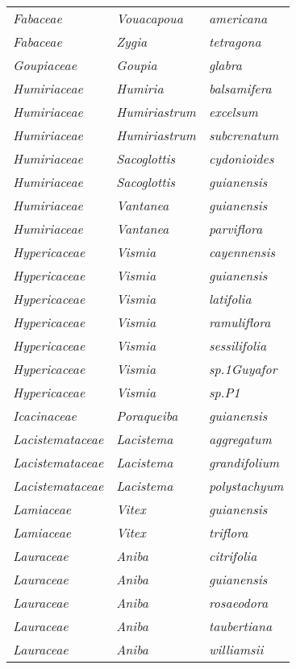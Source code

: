 \documentclass[fleqn,10pt]{ArtEcoFoG} %
\renewenvironment{table}{\begin{table*}}{\end{table*}\ignorespacesafterend}
\begin{document}
\begin{table}
\begin{tabular}[t]{lll}
\em{Fabaceae} & \em{Vouacapoua} & \em{americana}\\
\em{Fabaceae} & \em{Zygia} & \em{tetragona}\\
\em{Goupiaceae} & \em{Goupia} & \em{glabra}\\
\addlinespace
\em{Humiriaceae} & \em{Humiria} & \em{balsamifera}\\
\em{Humiriaceae} & \em{Humiriastrum} & \em{excelsum}\\
\em{Humiriaceae} & \em{Humiriastrum} & \em{subcrenatum}\\
\em{Humiriaceae} & \em{Sacoglottis} & \em{cydonioides}\\
\em{Humiriaceae} & \em{Sacoglottis} & \em{guianensis}\\
\addlinespace
\em{Humiriaceae} & \em{Vantanea} & \em{guianensis}\\
\em{Humiriaceae} & \em{Vantanea} & \em{parviflora}\\
\em{Hypericaceae} & \em{Vismia} & \em{cayennensis}\\
\em{Hypericaceae} & \em{Vismia} & \em{guianensis}\\
\em{Hypericaceae} & \em{Vismia} & \em{latifolia}\\
\addlinespace
\em{Hypericaceae} & \em{Vismia} & \em{ramuliflora}\\
\em{Hypericaceae} & \em{Vismia} & \em{sessilifolia}\\
\em{Hypericaceae} & \em{Vismia} & \em{sp.1Guyafor}\\
\em{Hypericaceae} & \em{Vismia} & \em{sp.P1}\\
\em{Icacinaceae} & \em{Poraqueiba} & \em{guianensis}\\
\addlinespace
\em{Lacistemataceae} & \em{Lacistema} & \em{aggregatum}\\
\em{Lacistemataceae} & \em{Lacistema} & \em{grandifolium}\\
\em{Lacistemataceae} & \em{Lacistema} & \em{polystachyum}\\
\em{Lamiaceae} & \em{Vitex} & \em{guianensis}\\
\em{Lamiaceae} & \em{Vitex} & \em{triflora}\\
\addlinespace
\em{Lauraceae} & \em{Aniba} & \em{citrifolia}\\
\em{Lauraceae} & \em{Aniba} & \em{guianensis}\\
\em{Lauraceae} & \em{Aniba} & \em{rosaeodora}\\
\em{Lauraceae} & \em{Aniba} & \em{taubertiana}\\
\em{Lauraceae} & \em{Aniba} & \em{williamsii}\\

\end{tabular}
\end{table}
\end{document}
